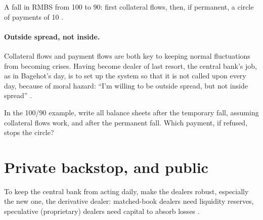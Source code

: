 \begin{paracol}{2}
\begin{nfigure}
\begin{taccts}
\quad
{}\quad
{}
\end{taccts}
\caption{A fall in RMBS from 100 to 90: first collateral flows, then, if permanent, a circle of payments of 10 .}\label{fig:cbs-numbers}
\end{nfigure}

\paragraph{Outside spread, not inside.} Collateral flows and payment flows are both key to keeping normal fluctuations from becoming crises. Having become dealer of last
resort, the central bank's job, as in Bagehot's day, is to set up the system so that it is not called upon every day, because of moral hazard: ``I'm willing to be
outside spread, but not inside spread'' .

\begin{exercise}
In the 100/90 example, write all balance sheets after the temporary fall, assuming collateral flows work, and after the permanent fall. Which payment, if refused, stops
the circle?
\end{exercise}

\section{Private backstop, and public}\label{sec:cbs-principles}

To keep the central bank from acting daily, make the dealers robust, especially the new one, the derivative dealer: matched-book dealers need liquidity reserves,
speculative (proprietary) dealers need capital to absorb losses .


\end{paracol}
